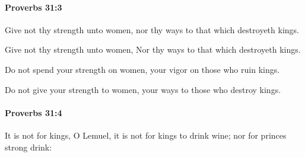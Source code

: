 		\paragraph{Proverbs 31:3} %
			\label{PROVERBS-31-3}

			Give not thy strength unto women, nor thy ways to that which destroyeth kings.

			\begin{versebox}
					\item[BHS] 
					\item[ASV] Give not thy strength unto women, Nor thy ways to that which destroyeth kings.
					\item[NIV] Do not spend your strength on women, your vigor on those who ruin kings.
					\item[NRSV] Do not give your strength to women, your ways to those who destroy kings.
			\end{versebox}

		\paragraph{Proverbs 31:4} %
			\label{PROVERBS-31-4}

			It is not for kings, O Lemuel, it is not for kings to drink wine; nor for princes strong drink:

